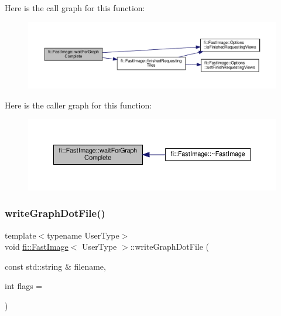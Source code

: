 Here is the call graph for this function\+:
\nopagebreak
\begin{figure}[H]
\begin{center}
\leavevmode
\includegraphics[width=350pt]{dc/d6b/classfi_1_1FastImage_aac69be21b7a131eade5b1ea79dbee59d_cgraph}
\end{center}
\end{figure}
Here is the caller graph for this function\+:
\nopagebreak
\begin{figure}[H]
\begin{center}
\leavevmode
\includegraphics[width=350pt]{dc/d6b/classfi_1_1FastImage_aac69be21b7a131eade5b1ea79dbee59d_icgraph}
\end{center}
\end{figure}
\mbox{\label{classfi_1_1FastImage_a79de6c7e6854a742c306d4ec5d942061}} 
\subsubsection{\texorpdfstring{write\+Graph\+Dot\+File()}{writeGraphDotFile()}}
{\footnotesize\ttfamily template$<$typename User\+Type$>$ \\
void \hyperlink{classfi_1_1FastImage}{fi\+::\+Fast\+Image}$<$ User\+Type $>$\+::write\+Graph\+Dot\+File (\begin{DoxyParamCaption}\item[{const std\+::string \&}]{filename,  }\item[{int}]{flags = {} }\end{DoxyParamCaption})\hspace{0.3cm}{\ttfamily [inline]}}



